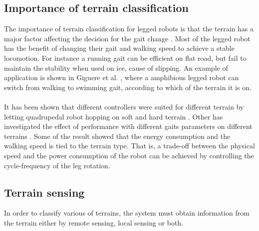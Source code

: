 \documentclass[USenglish]{ifimaster}  %
\begin{document}
\subsection{Importance of terrain classification}
The importance of terrain classification for legged robots is that the terrain has a major factor affecting the decision for the gait change \cite{6569179}. Most of the legged robot has the benefit of changing their gait and walking speed to achieve a stable locomotion. For instance a running gait can be efficient on flat road, but fail to maintain the stability when used on ice, cause of slipping. An example of application is shown in Giguere et al. \cite{Giguere06environmentidentification}, where a amphibious legged robot can switch from walking to swimming gait, according to which of the terrain it is on. 
\\
\\
It has been shown that different controllers were suited for different terrain by letting quadrupedal robot hopping on soft and hard terrain \cite{7487541}. Other has investigated the effect of performance with different gaits parameters on different terrains \cite{6569179}. Some of the result showed that the energy consumption and the walking speed is tied to the terrain type. That is, a trade-off between the physical speed and the power consumption of the robot can be achieved by controlling the cycle-frequency of the leg rotation.
	
	
\subsection{Terrain sensing}
In order to classify various of terrains, the system must obtain information from the terrain either by remote sensing, local sensing or both.
	
\end{document}
